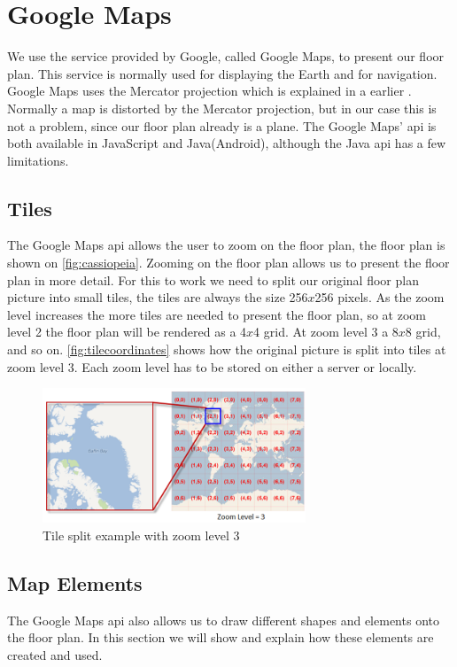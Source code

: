 \section{Google Maps}
We use the service provided by Google, called Google Maps, to present our floor plan. This service is normally used for displaying the Earth and for navigation. Google Maps uses the Mercator projection which is explained in a earlier . Normally a map is distorted by the Mercator projection, but in our case this is not a problem, since our floor plan already is a plane. The Google Maps' \ac{api} is both available in JavaScript and Java(Android), although the Java \ac{api} has a few limitations.

\subsection*{Tiles}
The Google Maps \ac{api} allows the user to zoom on the floor plan, the floor plan is shown on \autoref{fig:cassiopeia}. Zooming on the floor plan allows us to present the floor plan in more detail. For this to work we need to split our original floor plan picture into small tiles, the tiles are always the size 256$x$256 pixels. As the zoom level increases the more tiles are needed to present the floor plan, so at zoom level 2 the floor plan will be rendered as  a 4$x$4 grid. At zoom level 3 a 8$x$8 grid, and so on. \autoref{fig:tilecoordinates} shows how the original picture is split into tiles at zoom level 3. Each zoom level has to be stored on either a server or locally.

\begin{figure}[H]
\centering
\includegraphics[width=0.7\textwidth]{img/tilecoordinates2.png}
\caption{Tile split example with zoom level 3 \citep{tilecoordinates}}
\label{fig:tilecoordinates}
\end{figure}

\subsection*{Map Elements}
The Google Maps \ac{api} also allows us to draw different shapes and elements onto the floor plan. In this section we will show and explain how these elements are created and used.

